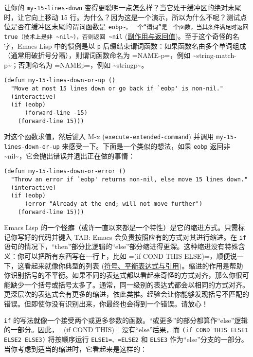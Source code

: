 \documentclass[11pt]{ctexart}
\begin{document}
让你的 \texttt{my-15-lines-down} 变得更聪明一点怎么样？当它处于缓冲区的绝对末尾时，让它向上移动 15 行。为什么？因为这是一个演示，所以为什么不呢？测试点位是否在缓冲区末尾的谓词函数是 \texttt{eobp\textasciitilde{}。一个“谓词”是一个函数，当其条件满足时返回 true（技术上是非 \textasciitilde{}nil\textasciitilde{}），否则返回 \textasciitilde{}nil} (\hyperref[sec:org7601617]{副作用与返回值})。至于这个奇怪的名字，Emacs Lisp 中的惯例是以 \texttt{p} 后缀结束谓词函数：如果函数名由多个单词组成（通常用破折号分隔），则谓词函数命名为 =NAME-p=，例如 \textasciitilde{}string-match-p\textasciitilde{}；否则命名为 =NAMEp=，例如 \textasciitilde{}stringp\textasciitilde{}。

\begin{verbatim}
(defun my-15-lines-down-or-up ()
  "Move at most 15 lines down or go back if `eobp' is non-nil."
  (interactive)
  (if (eobp)
      (forward-line -15)
    (forward-line 15)))
\end{verbatim}

对这个函数求值，然后键入 M-x (\texttt{execute-extended-command}) 并调用 \texttt{my-15-lines-down-or-up} 来感受一下。下面是一个类似的想法，如果 \texttt{eobp} 返回非 \textasciitilde{}nil\textasciitilde{}，它会抛出错误并退出正在做的事情：

\begin{verbatim}
(defun my-15-lines-down-or-error ()
  "Throw an error if `eobp' returns non-nil, else move 15 lines down."
  (interactive)
  (if (eobp)
      (error "Already at the end; will not move further")
    (forward-line 15)))
\end{verbatim}

Emacs Lisp 的一个怪癖（或许一直以来都是一个特性）是它的缩进方式。只需标记你写好的代码并键入 TAB: Emacs 会负责按照应有的方式对其进行缩进。在 \texttt{if} 语句的情况下，“then”部分比逻辑的“else”部分缩进得更深。这种缩进没有特殊含义：你可以把所有东西写在一行上，比如 =(if COND THIS ELSE)=，顺便说一下，这看起来就像你典型的列表 (\hyperref[sec:orgb51d706]{符号、平衡表达式与引用})。缩进的作用是帮助你识别括号的不平衡。如果不同的表达式都以看起来奇怪的方式对齐，那么你很可能缺少一个括号或括号太多了。通常，同一级别的表达式都会以相同的方式对齐。更深层次的表达式会有更多的缩进，依此类推。经验会让你能够发现括号不匹配的错误。但即使你没有识别出来，你最终也会得到一个错误。请放心！

\texttt{if} 的写法就像一个接受两个或更多参数的函数。“或更多”的部分都算作“else”逻辑的一部分。因此，=(if COND THIS)= 没有“else”后果，而 \texttt{(if COND THIS ELSE1 ELSE2 ELSE3)} 将按顺序运行 \texttt{ELSE1=、=ELSE2} 和 \texttt{ELSE3} 作为“else”分支的一部分。当你考虑到适当的缩进时，它看起来是这样的：
\end{document}
